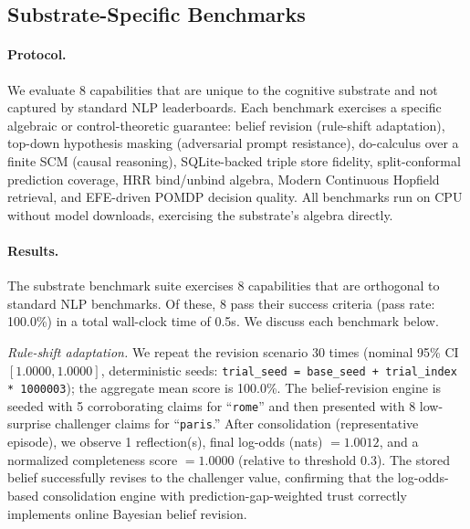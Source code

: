 \subsection{Substrate-Specific Benchmarks}
\label{subsec:exp-substrate}

\paragraph{Protocol.}
We evaluate 8 capabilities that are unique to the cognitive substrate and not captured by standard NLP leaderboards. Each benchmark exercises a specific algebraic or control-theoretic guarantee: belief revision (rule-shift adaptation), top-down hypothesis masking (adversarial prompt resistance), do-calculus over a finite SCM (causal reasoning), SQLite-backed triple store fidelity, split-conformal prediction coverage, HRR bind/unbind algebra, Modern Continuous Hopfield retrieval, and EFE-driven POMDP decision quality. All benchmarks run on CPU without model downloads, exercising the substrate's algebra directly.

\begin{table}[htbp]
\centering
\caption{Substrate benchmark suite: per-benchmark scores and pass/fail status. \textit{Suite total}: the Pass column reports $n_{\mathrm{passed}}/n_{\mathrm{benchmarks}}$; the Score column is the arithmetic mean of the eight per-benchmark scores (not the pass rate). Each benchmark Time rounds its duration (same precision regime as Score); Suite total Time rounds recorded wall-clock aggregate and need not agree with summed rounded benchmark times.}
\label{tab:substrate-benchmarks}

\end{table}

\paragraph{Results.}
The substrate benchmark suite exercises 8 capabilities that are orthogonal to standard NLP benchmarks. Of these, 8 pass their success criteria (pass rate: 100.0\%) in a total wall-clock time of 0.5s. We discuss each benchmark below.

\textit{Rule-shift adaptation.} We repeat the revision scenario 30 times (nominal 95\% CI $[1.0000, 1.0000]$, deterministic seeds: \texttt{trial\_seed = base\_seed + trial\_index * 1000003}); the aggregate mean score is 100.0\%. The belief-revision engine is seeded with 5 corroborating claims for ``\texttt{rome}'' and then presented with 8 low-surprise challenger claims for ``\texttt{paris}.'' After consolidation (representative episode), we observe 1 reflection(s), final log-odds (nats) $= 1.0012$, and a normalized completeness score $= 1.0000$ (relative to threshold 0.3). The stored belief successfully revises to the challenger value, confirming that the log-odds-based consolidation engine with prediction-gap-weighted trust correctly implements online Bayesian belief revision.

